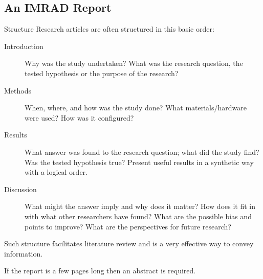 \documentclass[11pt,xcolor=dvipsnames]{beamer}
\begin{document}
\subsection{An IMRAD Report }
\label{sec-3-1}
\begin{frame}[label=sec-3-1-1]{Structure}
Research articles are often structured in this basic order:
\begin{description}
\item[{Introduction}] Why was the study undertaken? What was the research
question, the tested hypothesis or the purpose of
the research?
\item[{Methods}] When, where, and how was the study done? What
materials/hardware were used? How was it configured?
\item[{Results}] What answer was found to the research question; what did
the study find? Was the tested hypothesis true? \alert{Present
useful results in a synthetic way with a logical order}.
\item[{Discussion}] What might the answer imply and why does it matter?
How does it fit in with what other researchers have
found? What are the possible bias and points to
improve? What are the perspectives for future
research?
\end{description}

Such structure \alert{facilitates literature review} and is a very effective
way to convey information.

If the report is a few pages long then \alert{an abstract is required}.
\end{frame}
\end{document}
